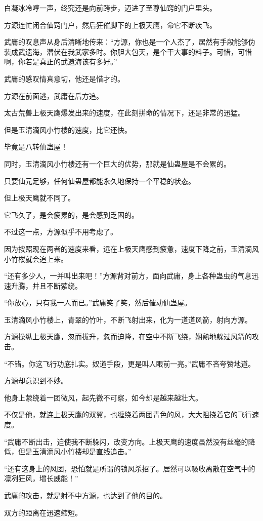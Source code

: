 \begin{this_body}
白凝冰冷哼一声，终究还是向前跨步，迈进了至尊仙窍的门户里头。

方源连忙闭合仙窍门户，然后狂催脚下的上极天鹰，命它不断疾飞。

武庸的叹息声从身后清晰地传来：“方源，你也是一个人杰了，居然有手段能够伪装成武遗海，潜伏在我武家多时。你胆大包天，是个干大事的料子。可惜，可惜啊，你若是真正的武遗海该有多好。”

武庸的感叹情真意切，他还是惜才的。

方源在前面逃，武庸在后方追。

太古荒兽上极天鹰爆发出来的速度，在此刻拼命的情况下，还是非常的迅猛。

但是玉清滴风小竹楼的速度，比它还快。

毕竟是八转仙蛊屋！

同时，玉清滴风小竹楼还有一个巨大的优势，那就是仙蛊屋是不会累的。

只要仙元足够，任何仙蛊屋都能永久地保持一个平稳的状态。

但上极天鹰就不同了。

它飞久了，是会疲累的，是会感到乏困的。

不过这一点，方源似乎不用考虑了。

因为按照现在两者的速度来看，远在上极天鹰感到疲惫，速度下降之前，玉清滴风小竹楼就会追上来。

“还有多少人，一并叫出来吧！”方源背对前方，面向武庸，身上各种蛊虫的气息迅速升腾，并且不断萦绕。

“你放心，只有我一人而已。”武庸笑了笑，然后催动仙蛊屋。

玉清滴风小竹楼上，青翠的竹叶，不断飞射出来，化为一道道风箭，射向方源。

方源操纵上极天鹰，忽而拔升，忽而迫降，在空中不断飞绕，娴熟地躲过风箭的攻击。

“不错。你这飞行功底扎实。奴道手段，更是叫人眼前一亮。”武庸不吝夸赞地道。

方源却意识到不妙。

他身上萦绕着一团微风，起先微不可察，如今却是越来越壮大。

不仅是他，就连上极天鹰的双翼，也缠绕着两团青色的风，大大阻挠着它的飞行速度。

“武庸不断出击，迫使我不断躲闪，改变方向。上极天鹰的速度虽然没有丝毫的降低，但是玉清滴风小竹楼却是直线追击。”

“还有这身上的风团，恐怕就是所谓的锁风杀招了。居然可以吸收离散在空气中的凛冽狂风，增长威能！”

武庸的攻击，就是射不中方源，也达到了他的目的。

双方的距离在迅速缩短。


\end{this_body}
